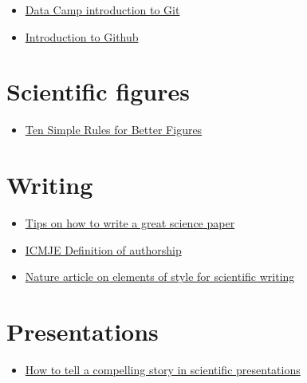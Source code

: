 \documentclass[
]{book}
\providecommand{\tightlist}{%
  \setlength{\itemsep}{0pt}\setlength{\parskip}{0pt}}
\begin{document}
\begin{itemize}
\tightlist
\item
  \href{https://www.datacamp.com/courses/introduction-to-git-for-data-science}{Data Camp introduction to Git}
\item
  \href{https://lab.github.com/githubtraining/introduction-to-github}{Introduction to Github}
\end{itemize}

\hypertarget{scientific-figures}{%
\section{Scientific figures}\label{scientific-figures}}

\begin{itemize}
\tightlist
\item
  \href{https://journals.plos.org/ploscompbiol/article?id=10.1371/journal.pcbi.1003833}{Ten Simple Rules for Better Figures}
\end{itemize}

\hypertarget{writing}{%
\section{Writing}\label{writing}}

\begin{itemize}
\tightlist
\item
  \href{https://www.nature.com/articles/d41586-019-02918-5}{Tips on how to write a great science paper}
\item
  \href{http://www.icmje.org/recommendations/browse/roles-and-responsibilities/defining-the-role-of-authors-and-contributors.html}{ICMJE Definition of authorship}
\item
  \href{https://www.nature.com/articles/nphys724}{Nature article on elements of style for scientific writing}
\end{itemize}

\hypertarget{presentations}{%
\section{Presentations}\label{presentations}}

\begin{itemize}
\tightlist
\item
  \href{https://www.nature.com/articles/d41586-021-03603-2}{How to tell a compelling story in scientific presentations}
\end{itemize}

  
\end{document}
